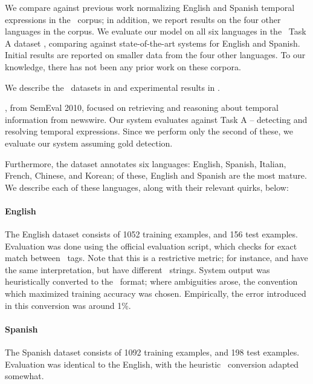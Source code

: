 We compare against previous work normalizing English and Spanish temporal
  expressions in the \tempeval\ corpus; in addition, we report results on
  the four other languages in the corpus.
We evaluate our model on all six languages in the \tempeval\ Task A dataset
  \cite{key:2010verhagen-tempeval}, comparing against state-of-the-art
  systems for English and Spanish.
Initial results are reported on smaller data from the four other languages.
To our knowledge, there has not been any prior work on these corpora.

We describe the \tempeval\ datasets in  and experimental
  results in .

\tempeval, from SemEval 2010, focused on retrieving and reasoning
  about temporal information from newswire.
Our system evaluates against Task A -- detecting and resolving temporal
  expressions.
Since we perform only the second of these, we evaluate our system
	assuming gold detection.

Furthermore, the dataset annotates six languages:
  English, Spanish, Italian, French, Chinese, and Korean;
  of these, English and Spanish are the most mature.
We describe each of these languages, along with their relevant quirks, below:

\paragraph{English}
The English dataset consists of 1052 training examples, and 156 test examples.
Evaluation was done using the official evaluation script, which checks for
  exact match between \timex\ tags.
Note that this is a restrictive metric; for instance,  and
   have the same interpretation, but
  have different \timex\ strings.
System output was heuristically converted to the \timex\ format; where
  ambiguities arose, the convention which maximized training accuracy was
  chosen.
Empirically, the error introduced in this conversion was around 1\%.

\paragraph{Spanish}
The Spanish dataset consists of 1092 training examples, and 198 test examples.
Evaluation was identical to the English, with the heuristic \timex\ conversion
  adapted somewhat.

